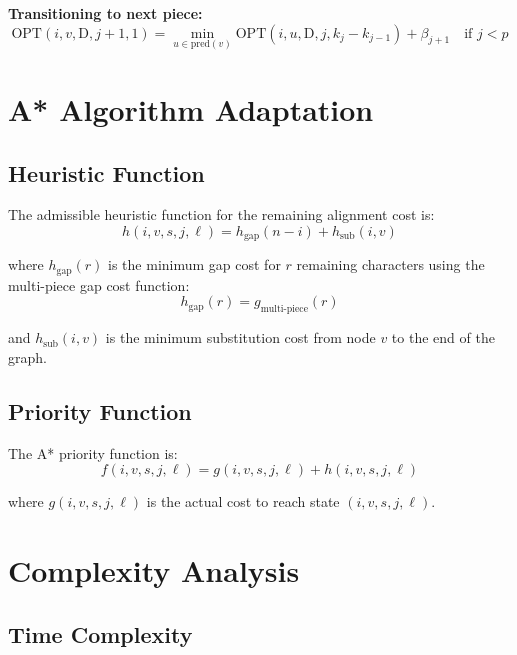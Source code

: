 \documentclass[11pt]{article}
\begin{document}
\textbf{Transitioning to next piece:}
\begin{equation}
\text{OPT}(i, v, \text{D}, j+1, 1) = \min_{u \in \text{pred}(v)} \text{OPT}(i, u, \text{D}, j, k_j - k_{j-1}) + \beta_{j+1} \quad \text{if } j < p
\end{equation}

\section{A* Algorithm Adaptation}

\subsection{Heuristic Function}

The admissible heuristic function for the remaining alignment cost is:
\begin{equation}
h(i, v, s, j, \ell) = h_{\text{gap}}(n-i) + h_{\text{sub}}(i, v)
\end{equation}

where $h_{\text{gap}}(r)$ is the minimum gap cost for $r$ remaining characters using the multi-piece gap cost function:
\begin{equation}
h_{\text{gap}}(r) = g_{\text{multi-piece}}(r)
\end{equation}

and $h_{\text{sub}}(i, v)$ is the minimum substitution cost from node $v$ to the end of the graph.

\subsection{Priority Function}

The A* priority function is:
\begin{equation}
f(i, v, s, j, \ell) = g(i, v, s, j, \ell) + h(i, v, s, j, \ell)
\end{equation}

where $g(i, v, s, j, \ell)$ is the actual cost to reach state $(i, v, s, j, \ell)$.

\section{Complexity Analysis}

\subsection{Time Complexity}
\end{document}
